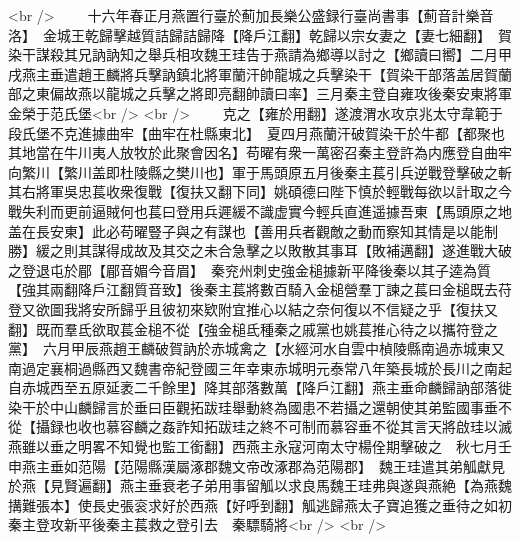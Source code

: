 <br />
　　十六年春正月燕置行臺於薊加長樂公盛録行臺尚書事【薊音計樂音洛】　金城王乾歸擊越質詰歸詰歸降【降戶江翻】乾歸以宗女妻之【妻七細翻】　賀染干謀殺其兄訥訥知之舉兵相攻魏王珪告于燕請為鄉導以討之【鄉讀曰嚮】二月甲戌燕主垂遣趙王麟將兵擊訥鎮北將軍蘭汗帥龍城之兵擊染干【賀染干部落盖居賀蘭部之東偏故燕以龍城之兵擊之將即亮翻帥讀曰率】三月秦主登自雍攻後秦安東將軍金榮于范氏堡<br />
<br />
　　克之【雍於用翻】遂渡渭水攻京兆太守韋範于段氏堡不克進據曲牢【曲牢在杜縣東北】　夏四月燕蘭汗破賀染干於牛都【都聚也其地當在牛川夷人放牧於此聚會因名】苟曜有衆一萬密召秦主登許為内應登自曲牢向繁川【繁川盖即杜陵縣之樊川也】軍于馬頭原五月後秦主萇引兵逆戰登擊破之斬其右將軍吳忠萇收衆復戰【復扶又翻下同】姚碩德曰陛下慎於輕戰每欲以計取之今戰失利而更前逼賊何也萇曰登用兵遲緩不識虚實今輕兵直進遥據吾東【馬頭原之地盖在長安東】此必苟曜豎子與之有謀也【善用兵者觀敵之動而察知其情是以能制勝】緩之則其謀得成故及其交之未合急擊之以敗散其事耳【敗補邁翻】遂進戰大破之登退屯於郿【郿音媚今音眉】　秦兖州刺史強金槌據新平降後秦以其子逵為質【強其兩翻降戶江翻質音致】後秦主萇將數百騎入金槌營羣丁諫之萇曰金槌既去苻登又欲圖我將安所歸乎且彼初來欵附宜推心以結之奈何復以不信疑之乎【復扶又翻】既而羣氐欲取萇金槌不從【強金槌氐種秦之戚黨也姚萇推心待之以攜符登之黨】　六月甲辰燕趙王麟破賀訥於赤城禽之【水經河水自雲中楨陵縣南過赤城東又南過定襄桐過縣西又魏書帝紀登國三年幸東赤城明元泰常八年築長城於長川之南起自赤城西至五原延袤二千餘里】降其部落數萬【降戶江翻】燕主垂命麟歸訥部落徙染干於中山麟歸言於垂曰臣觀拓跋珪舉動終為國患不若攝之還朝使其弟監國事垂不從【攝録也收也慕容麟之姦詐知拓跋珪之終不可制而慕容垂不從其言天將啟珪以滅燕雖以垂之明畧不知覺也監工銜翻】西燕主永寇河南太守楊佺期擊破之　秋七月壬申燕主垂如范陽【范陽縣漢屬涿郡魏文帝改涿郡為范陽郡】　魏王珪遣其弟觚獻見於燕【見賢遍翻】燕主垂衰老子弟用事留觚以求良馬魏王珪弗與遂與燕絶【為燕魏搆難張本】使長史張衮求好於西燕【好呼到翻】觚逃歸燕太子寶追獲之垂待之如初秦主登攻新平後秦主萇救之登引去　秦驃騎將<br />
<br />
